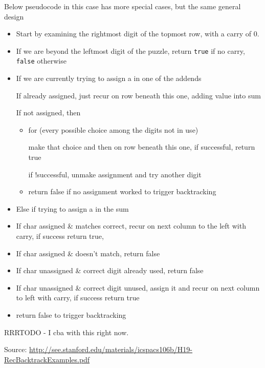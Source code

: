 Below pseudocode in this case has more special cases, but the same general
design
\begin{itemize}%
\item Start by examining the rightmost digit of the topmost row, with a
  carry of $0$.
\item If we are beyond the leftmost digit of the puzzle, return
  \texttt{true} if no carry, \texttt{false} otherwise
\item If we are currently trying to assign a  in one of the addends

If  already assigned, just recur on row beneath this one, adding
value into sum

If not assigned, then
\begin{itemize}%
\item for (every possible choice among the digits not in use)

make that choice and then on row beneath this one, if successful, return
true

if !successful, unmake assignment and try another digit

\item return false if no assignment worked to trigger backtracking
\end{itemize}
\item Else if trying to assign a  in the sum
\item 
If char assigned \& matches correct,
recur on next column to the left with carry, if success return true,
\item 
If char assigned \& doesn't match, return false
\item 
If char unassigned \& correct digit already used, return false
\item 
If char unassigned \& correct digit unused,
assign it and recur on next column to left with carry, if success return true
\item return false to trigger backtracking
\end{itemize}

\textbf{}

\RayNotesBegin

RRRTODO - I cba with this right now.

\RayNotesEnd

\textbf{}

Source:
\url{http://see.stanford.edu/materials/icspacs106b/H19-RecBacktrackExamples.pdf}


